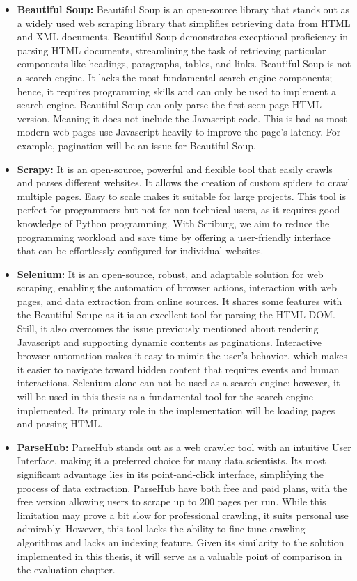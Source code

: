 \begin{itemize}
  \item[] \textbf{Beautiful Soup:} Beautiful Soup is an open-source library that stands out as a widely used web scraping library that simplifies retrieving data from HTML and XML documents. Beautiful Soup demonstrates exceptional proficiency in parsing HTML documents, streamlining the task of retrieving particular components like headings, paragraphs, tables, and links. Beautiful Soup is not a search engine. It lacks the most fundamental search engine components; hence, it requires programming skills and can only be used to implement a search engine. Beautiful Soup can only parse the first seen page HTML version. Meaning it does not include the Javascript code. This is bad as most modern web pages use Javascript heavily to improve the page's latency. For example, pagination will be an issue for Beautiful Soup.

  \item[] \textbf{Scrapy:} It is an open-source, powerful and flexible tool that easily crawls and parses different websites. It allows the creation of custom spiders to crawl multiple pages. Easy to scale makes it suitable for large projects. This tool is perfect for programmers but not for non-technical users, as it requires good knowledge of Python programming. With Scriburg, we aim to reduce the programming workload and save time by offering a user-friendly interface that can be effortlessly configured for individual websites.

  \item[] \textbf{Selenium:} It is an open-source, robust, and adaptable solution for web scraping, enabling the automation of browser actions, interaction with web pages, and data extraction from online sources. It shares some features with the Beautiful Soupe as it is an excellent tool for parsing the HTML DOM. Still, it also overcomes the issue previously mentioned about rendering Javascript and supporting dynamic contents as paginations. Interactive browser automation makes it easy to mimic the user's behavior, which makes it easier to navigate toward hidden content that requires events and human interactions. Selenium alone can not be used as a search engine; however, it will be used in this thesis as a fundamental tool for the search engine implemented. Its primary role in the implementation will be loading pages and parsing HTML.   

  \item[] \textbf{ParseHub:} ParseHub stands out as a web crawler tool with an intuitive User Interface, making it a preferred choice for many data scientists. Its most significant advantage lies in its point-and-click interface, simplifying the process of data extraction. ParseHub have both free and paid plans, with the free version allowing users to scrape up to 200 pages per run. While this limitation may prove a bit slow for professional crawling, it suits personal use admirably. However, this tool lacks the ability to fine-tune crawling algorithms and lacks an indexing feature. Given its similarity to the solution implemented in this thesis, it will serve as a valuable point of comparison in the evaluation chapter. 
\end{itemize}

